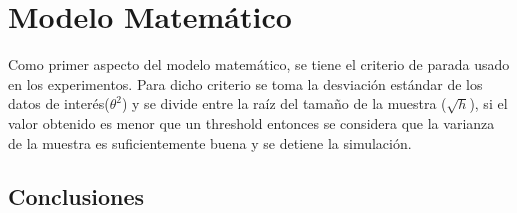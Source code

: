 \documentclass[10pt,twocolumn]{article}
\begin{document}


\section{Modelo Matemático}

Como primer aspecto del modelo matemático, se tiene el criterio de parada usado en los experimentos. Para dicho criterio se toma la desviación estándar de los datos de interés($\theta^{2}$) y se divide entre la raíz del tamaño de la muestra ($\sqrt{h}$), si el valor obtenido es menor que un threshold entonces se considera que la varianza de la muestra es suficientemente buena y se detiene la simulación.

\subsection{Conclusiones}
\end{document}
